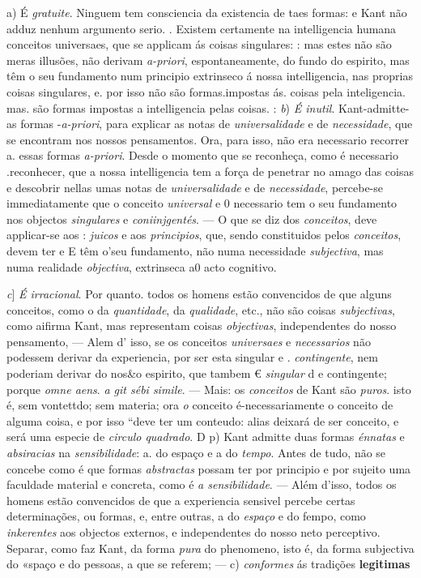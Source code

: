 a) É \emph{gratuite}. Ninguem tem consciencia da existencia de taes formas: e Kant não adduz nenhum argumento serio. . Existem certamente na intelligencia humana conceitos universaes, que se applicam ás coisas singulares: : mas estes não são meras illusões, não derivam \emph{a-priori}, espontaneamente, do fundo do espirito, mas têm o seu fundamento num principio extrinseco á nossa intelligencia, nas proprias coisas singulares, e. por isso não são formas.impostas ás. coisas pela inteligencia. mas. são formas impostas a intelligencia pelas coisas. : \emph{b}) \emph{É inutil}. Kant-admitte- as formas -\emph{a-priori}, para explicar as notas de \emph{universalidade} e de \emph{necessidade}, que se encontram nos nossos pensamentos. Ora, para isso, não era necessario recorrer a. essas formas \emph{a-priori}. Desde o momento que se reconheça, como é necessario .reconhecer, que a nossa intelligencia tem a força de penetrar no amago das coisas e descobrir nellas umas notas de \emph{universalidade} e de \emph{necessidade}, percebe-se immediatamente que o conceito \emph{universal} e 0 necessario tem o seu fundamento nos objectos \emph{singulares} e \emph{coniinjgentés}. --- O que se diz dos \emph{conceitos}, deve applicar-se aos : \emph{juicos} e aos \emph{principios}, que, sendo constituidos pelos \emph{conceitos}, devem ter e E têm o'seu fundamento, não numa necessidade \emph{subjectiva}, mas numa realidade \emph{objectiva}, extrinseca a0 acto cognitivo.

\emph{c}] \emph{É irracional}. Por quanto. todos os homens estão convencidos de que alguns conceitos, como o da \emph{quantidade}, da \emph{qualidade}, etc., não são coisas \emph{subjectivas}, como aifirma Kant, mas representam coisas \emph{objectivas}, independentes do nosso pensamento, --- Alem d' isso, se os conceitos \emph{universaes} e \emph{necessarios} não podessem derivar da experiencia, por ser esta singular e . \emph{contingente}, nem poderiam derivar do nos\&o espirito, que tambem € \emph{singular} d e contingente; porque \emph{omne aens}. \emph{a git sébi simile}. --- Mais: os \emph{conceitos} de \textbar{} Kant são \emph{puros}. isto é, sem vontettdo; sem materia; ora \emph{o} conceito é-necessariamente o conceito de alguma coisa, e por isso “deve ter um conteudo: \textbar{} alias deixará de ser conceito, e será uma especie de \emph{circulo quadrado}. D p) Kant admitte duas formas \emph{énnatas} e \emph{absiracias} na \emph{sensibilidade}: a. do espaço e a do \emph{tempo}. Antes de tudo, não se concebe como é que formas \emph{abstractas} possam ter por principio e por sujeito uma faculdade material e concreta, como é \emph{a sensibilidade}. --- Além d'isso, todos os homens estão convencidos de que a experiencia sensivel percebe certas determinações, ou formas, e, entre outras, a do \emph{espaço} e do fempo, como \emph{inkerentes} aos objectos externos, e independentes do nosso neto perceptivo. Separar, como faz Kant, da forma \emph{pura} do phenomeno, isto é, da forma subjectiva do «spaço e do   pessoas, a que se referem; --- c) \emph{conformes} ás tradições \textbf{legitimas}

